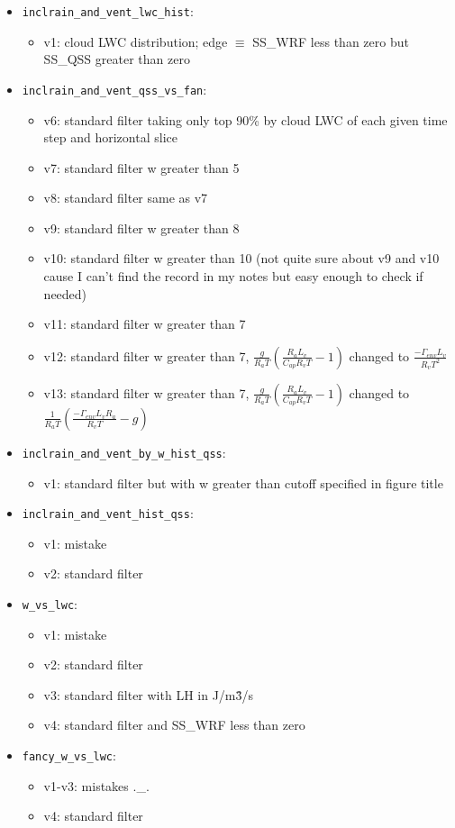 \documentclass{article}
\begin{document}
\begin{itemize}
\begin{itemize}
		\item \texttt{inclrain\_and\_vent\_lwc\_hist}:
		\begin{itemize}
			\item v1: cloud LWC distribution; edge $\equiv$ SS\_WRF less than zero but SS\_QSS greater than zero
		\end{itemize}
		\item \texttt{inclrain\_and\_vent\_qss\_vs\_fan}:
		\begin{itemize}
			\item v6: standard filter taking only top 90\% by cloud LWC of each given time step and horizontal slice
			\item v7: standard filter w greater than 5
			\item v8: standard filter same as v7
			\item v9: standard filter w greater than 8
			\item v10: standard filter w greater than 10 (not quite sure about v9 and v10 cause I can't find the record in my notes but easy enough to check if needed)
			\item v11: standard filter w greater than 7
			\item v12: standard filter w greater than 7, $\frac{g}{R_a T}(\frac{R_aL_v}{C_{ap}R_vT} - 1)$ changed to $\frac{-\Gamma_{env}L_v}{R_v T^2}$
			\item v13: standard filter w greater than 7, $\frac{g}{R_a T}(\frac{R_aL_v}{C_{ap}R_vT} - 1)$ changed to $\frac{1}{R_aT}(\frac{-\Gamma_{env}L_vR_a}{R_v T}-g)$
		\end{itemize}
		\item \texttt{inclrain\_and\_vent\_by\_w\_hist\_qss}:
		\begin{itemize}
			\item v1: standard filter but with w greater than cutoff specified in figure title
		\end{itemize}
		\item \texttt{inclrain\_and\_vent\_hist\_qss}:
		\begin{itemize}
			\item v1: mistake
			\item v2: standard filter
		\end{itemize}
		\item \texttt{w\_vs\_lwc}:
		\begin{itemize}
			\item v1: mistake
			\item v2: standard filter
			\item v3: standard filter with LH in J/m\^3/s
			\item v4: standard filter and SS\_WRF less than zero
		\end{itemize}
		\item \texttt{fancy\_w\_vs\_lwc}:
		\begin{itemize}
			\item v1-v3: mistakes .\_.
			\item v4: standard filter
		\end{itemize}
	\end{itemize}
\end{itemize}
\end{document}

